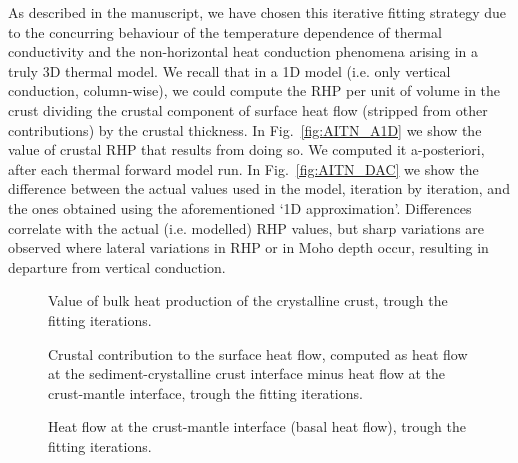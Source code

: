 {\begin{subappendices}
As described in the manuscript, we have chosen this iterative fitting strategy due to the concurring behaviour of the temperature dependence of thermal conductivity and the non-horizontal heat conduction phenomena arising in a truly 3D thermal model.
We recall that in a 1D model (i.e. only vertical conduction, column-wise), we could compute the RHP per unit of volume in the crust dividing the crustal component of surface heat flow (stripped from other contributions) by the crustal thickness.
In Fig.~\ref{fig:AITN_A1D} we show the value of crustal RHP that results from doing so.
We computed it a-posteriori, after each thermal forward model run.
In Fig.~\ref{fig:AITN_DAC} we show the difference between the actual values used in the model, iteration by iteration, and the ones obtained using the aforementioned `1D approximation'.
Differences correlate with the actual (i.e. modelled) RHP values, but sharp variations are observed where lateral variations in RHP or in Moho depth occur, resulting in departure from vertical conduction.

\FloatBarrier

\begin{figure}
	\begin{adjustbox}{center}
	\end{adjustbox}
	\caption{Value of bulk heat production of the crystalline crust, trough the fitting iterations.}
	\label{fig:AITN_ACC}
\end{figure}

\begin{figure}
	\begin{adjustbox}{center}
	\end{adjustbox}
	\caption{Crustal contribution to the surface heat flow, computed as heat flow at the sediment-crystalline crust interface minus heat flow at the crust-mantle interface, trough the fitting iterations.}
	\label{fig:AITN_Qc}
\end{figure}

\begin{figure}
	\begin{adjustbox}{center}
	\end{adjustbox}
	\caption{Heat flow at the crust-mantle interface (basal heat flow), trough the fitting iterations.}
	\label{fig:AITN_Qm}
\end{figure}


\end{subappendices}}
